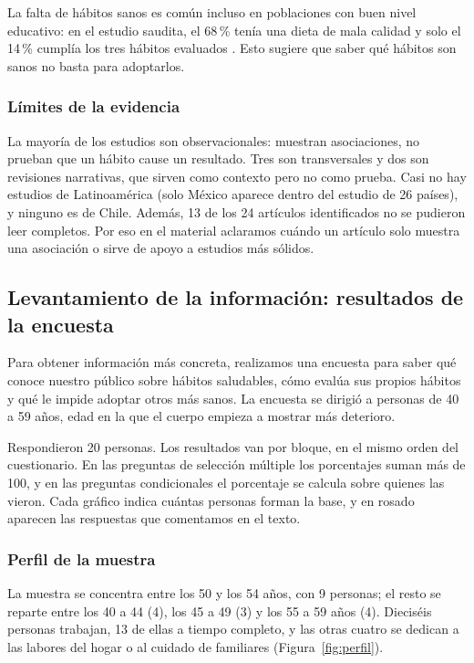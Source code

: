 \documentclass[12pt, letterpaper, table, xcdraw]{extarticle}
\begin{document}
La falta de hábitos sanos es común incluso en poblaciones con buen nivel educativo: en el estudio saudita, el 68\,\% tenía una dieta de mala calidad y solo el 14\,\% cumplía los tres hábitos evaluados \parencite{naaman2025}. Esto sugiere que saber qué hábitos son sanos no basta para adoptarlos.

\subsubsection{Límites de la evidencia}

 La mayoría de los estudios son observacionales: muestran asociaciones, no prueban que un hábito cause un resultado. Tres son transversales y dos son revisiones narrativas, que sirven como contexto pero no como prueba. Casi no hay estudios de Latinoamérica (solo México aparece dentro del estudio de 26 países), y ninguno es de Chile. Además, 13 de los 24 artículos identificados no se pudieron leer completos. Por eso en el material aclaramos cuándo un artículo solo muestra una asociación o sirve de apoyo a estudios más sólidos.

\subsection{Levantamiento de la información: resultados de la encuesta}
\label{sec:encuesta}

Para obtener información más concreta, realizamos una encuesta para saber qué conoce nuestro público sobre hábitos saludables, cómo evalúa sus propios hábitos y qué le impide adoptar otros más sanos. La encuesta se dirigió a personas de 40 a 59 años, edad en la que el cuerpo empieza a mostrar más deterioro.

Respondieron 20 personas. Los resultados van por bloque, en el mismo orden del cuestionario. En las preguntas de selección múltiple los porcentajes suman más de 100, y en las preguntas condicionales el porcentaje se calcula sobre quienes las vieron. Cada gráfico indica cuántas personas forman la base, y en rosado aparecen las respuestas que comentamos en el texto.

\subsubsection{Perfil de la muestra}

La muestra se concentra entre los 50 y los 54 años, con 9 personas; el resto se reparte entre los 40 a 44 (4), los 45 a 49 (3) y los 55 a 59 años (4). Dieciséis personas trabajan, 13 de ellas a tiempo completo, y las otras cuatro se dedican a las labores del hogar o al cuidado de familiares (Figura~\ref{fig:perfil}).
\end{document}
